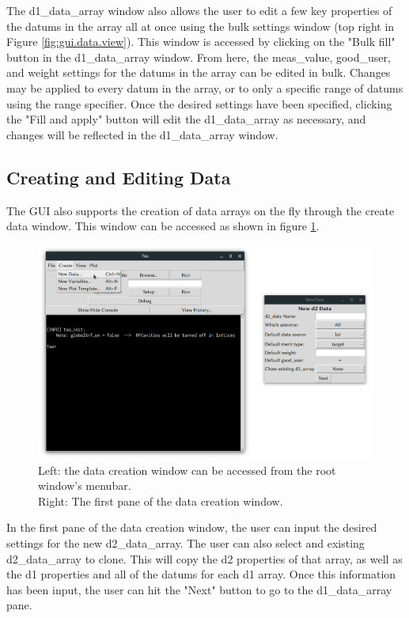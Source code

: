 The d1_data_array window also allows the user to edit a few key properties of the datums in the array all at once using the bulk settings window (top right in Figure \ref{fig:gui.data.view}).
This window is accessed by clicking on the "Bulk fill" button in the d1_data_array window.
From here, the meas_value, good_user, and weight settings for the datums in the array can be edited in bulk.
Changes may be applied to every datum in the array, or to only a specific range of datums using the range specifier.
Once the desired settings have been specified, clicking the "Fill and apply" button will edit the d1_data_array as necessary, and changes will be reflected in the d1_data_array window.

\subsection{Creating and Editing Data}
\label{s:gui.data.edit}

The GUI also supports the creation of data arrays on the fly through the create data window.
This window can be accessed as shown in figure \ref{fig:gui.create.data.d2}.
\begin{figure}
\centering
\includegraphics[width=12cm]{figures/create_d2.png}
\caption{Left: the data creation window can be accessed from the root window's menubar. \\
Right: The first pane of the data creation window.}
\label{fig:gui.create.data.d2}
\end{figure}
In the first pane of the data creation window, the user can input the desired settings for the new d2_data_array.
The user can also select and existing d2_data_array to clone.
This will copy the d2 properties of that array, as well as the d1 properties and all of the datums for each d1 array.
Once this information has been input, the user can hit the "Next" button to go to the d1_data_array pane.


